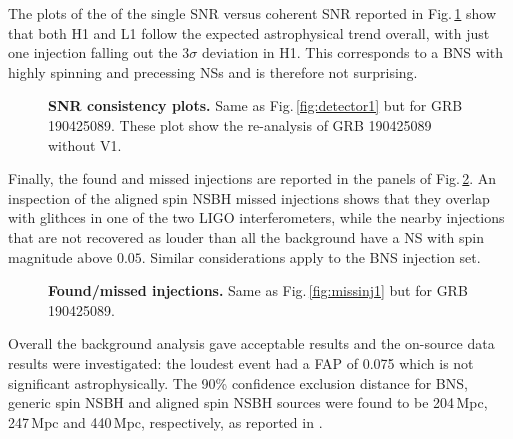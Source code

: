 \documentclass[binding=0.6cm, LaM]{sapthesis}
\begin{document}
	The plots of the of the single SNR versus coherent SNR reported in Fig.\,\ref{fig:detector3_final} show that both H1 and L1
	follow the expected astrophysical trend overall, with just one injection falling out the 3$\sigma$ deviation in H1.  This corresponds to a BNS with highly spinning and precessing NSs and is therefore not surprising.
        \begin{figure}[!t]
          \noindent
          \label{detector3_final}
          \centering
          \caption{\textbf{SNR consistency plots.} Same as Fig.\,\ref{fig:detector1} but for GRB 190425089. These plot show the re-analysis of  GRB 190425089 without V1.}
          \label{fig:detector3_final}
        \end{figure}
	
        Finally, the found and missed injections are reported in the panels of Fig.\,\ref{fig:missinj3_5}.  An inspection of the aligned spin NSBH missed injections shows that they overlap with glithces in one of the two LIGO interferometers, while the nearby injections that are not recovered as louder than all the background have a NS with spin magnitude above $0.05$.
        Similar considerations apply to the BNS injection set.
        \begin{figure}[!t]
          \noindent
          \label{missinj3_5}
          \centering
          \caption{\textbf{Found/missed injections.} Same as Fig.\,\ref{fig:missinj1} but for GRB 190425089.}
          \label{fig:missinj3_5}
        \end{figure}
	Overall the background analysis gave acceptable results
	and the on-source data results were investigated: 
	the loudest event had a FAP of 0.075 which is not significant astrophysically.  The 90\% confidence exclusion distance for BNS, generic spin NSBH and aligned spin NSBH sources were found to be 204\,Mpc, 247\,Mpc and 440\,Mpc, respectively, as reported in \cite{43}.
\end{document}
